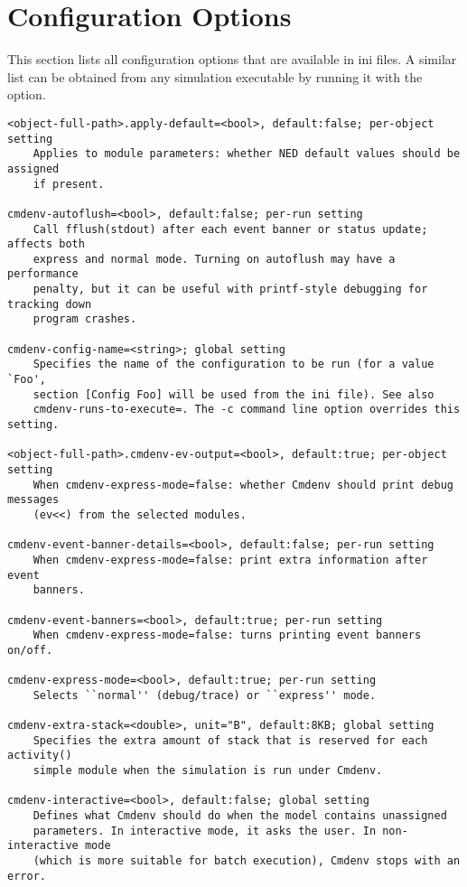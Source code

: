 \label{cha:config-options}

\section{Configuration Options}

This section lists all configuration options that are available in ini files.
A similar list can be obtained from any simulation executable by running it
with the  option.

\begin{verbatim}
<object-full-path>.apply-default=<bool>, default:false; per-object setting
    Applies to module parameters: whether NED default values should be assigned
    if present.

cmdenv-autoflush=<bool>, default:false; per-run setting
    Call fflush(stdout) after each event banner or status update; affects both
    express and normal mode. Turning on autoflush may have a performance
    penalty, but it can be useful with printf-style debugging for tracking down
    program crashes.

cmdenv-config-name=<string>; global setting
    Specifies the name of the configuration to be run (for a value `Foo',
    section [Config Foo] will be used from the ini file). See also
    cmdenv-runs-to-execute=. The -c command line option overrides this setting.

<object-full-path>.cmdenv-ev-output=<bool>, default:true; per-object setting
    When cmdenv-express-mode=false: whether Cmdenv should print debug messages
    (ev<<) from the selected modules.

cmdenv-event-banner-details=<bool>, default:false; per-run setting
    When cmdenv-express-mode=false: print extra information after event
    banners.

cmdenv-event-banners=<bool>, default:true; per-run setting
    When cmdenv-express-mode=false: turns printing event banners on/off.

cmdenv-express-mode=<bool>, default:true; per-run setting
    Selects ``normal'' (debug/trace) or ``express'' mode.

cmdenv-extra-stack=<double>, unit="B", default:8KB; global setting
    Specifies the extra amount of stack that is reserved for each activity()
    simple module when the simulation is run under Cmdenv.

cmdenv-interactive=<bool>, default:false; global setting
    Defines what Cmdenv should do when the model contains unassigned
    parameters. In interactive mode, it asks the user. In non-interactive mode
    (which is more suitable for batch execution), Cmdenv stops with an error.


\end{verbatim}
